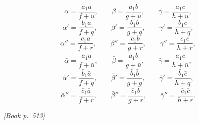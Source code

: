 \documentclass[11pt]{article}
\begin{document}
\[
\alpha = \frac{a_{1} a}{f + u},\qquad \beta = \frac{a_{1} b}{g + u},\qquad \gamma = \frac{a_{1} c}{h + u},
\]
\[
\alpha' = \frac{b_{1} a}{f + q},\qquad \beta' = \frac{b_{1} b}{g + q},\qquad \gamma' = \frac{b_{1} c}{h + q},
\]
\[
\alpha'' = \frac{c_{1} a}{f + r},\qquad \beta'' = \frac{c_{1} b}{g + r},\qquad \gamma'' = \frac{c_{1} c}{h + r},
\]
\[
\bar{\alpha} = \frac{\bar{a}_{1} \bar{a}}{f + \bar{u}},\qquad \bar{\beta} = \frac{\bar{a}_{1} \bar{b}}{g + \bar{u}},\qquad \bar{\gamma} = \frac{\bar{a}_{1} \bar{c}}{h + \bar{u}},
\]
\[
\bar{\alpha}' = \frac{\bar{b}_{1} \bar{a}}{f + q},\qquad \bar{\beta}' = \frac{\bar{b}_{1} \bar{b}}{g + q},\qquad \bar{\gamma}' = \frac{\bar{b}_{1} \bar{c}}{h + q},
\]
\[
\bar{\alpha}'' = \frac{\bar{c}_{1} \bar{a}}{f + r},\qquad \bar{\beta}'' = \frac{\bar{c}_{1} \bar{b}}{g + r},\qquad \bar{\gamma}'' = \frac{\bar{c}_{1} \bar{c}}{h + r}.
\]

\medskip
\noindent\textit{[Book p.~513]}\hfill

\smallskip
\end{document}
